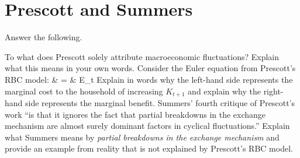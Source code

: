 \newpage
\section{Prescott and Summers} Answer the following.
	
	\EN
	 To what does Prescott solely attribute macroeconomic fluctuations? Explain what this means in your own words.
	 Consider the Euler equation from Prescott's RBC model:
		\EE
		 & = & \beta E_t
		\FF
	Explain in words why the left-hand side represents the marginal cost to the household of increasing $K_{t+1}$ and explain why the right-hand side represents the marginal benefit.	
	 Summers' fourth critique of Prescott's work ``is that it ignores the fact that partial breakdowns in the exchange mechanism are almost surely dominant factors in cyclical fluctuations.'' Explain what Summers means by \emph{partial breakdowns in the exchange mechanism} and provide an example from reality that is not explained by Prescott's RBC model.

	
	\NE